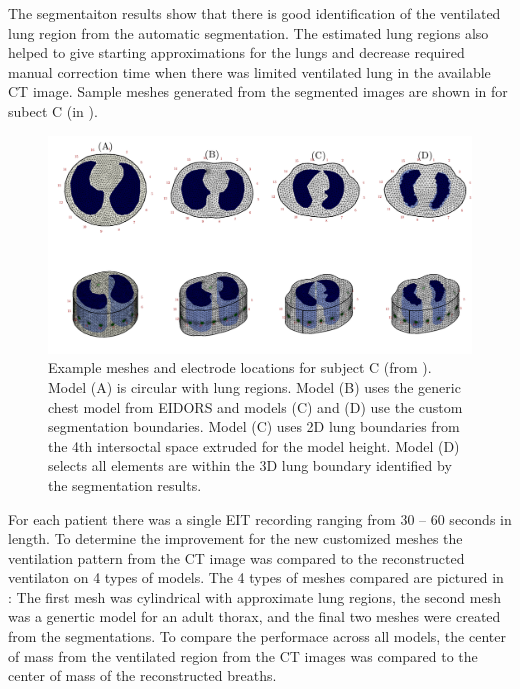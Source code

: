 The segmentaiton results show that there is good identification of the
ventilated lung region from the automatic segmentation. The estimated lung regions also helped to 
give starting approximations for the lungs and decrease required manual 
correction time when there was limited ventilated lung in the available CT image.
Sample meshes generated from the segmented images are shown in  
for subect C (in ).

\begin{figure}
	\centering
	\includegraphics[width=\textwidth]{chapter5-CT_to_mesh/imgs/fem_models_PT04.pdf}
	\caption[Custom and generic meshes]{\label{fig:fem-results}%
	Example meshes and electrode locations for subject C (from ).
	Model (A) is circular with lung regions. Model (B) uses the generic chest model from EIDORS 
	and models (C) and (D) use the custom segmentation boundaries. Model (C) uses 2D lung boundaries 
	from the 4th intersoctal space extruded for the model height. Model (D) selects all elements
	are within the 3D lung boundary identified by the segmentation results.
	}
\end{figure}

For each patient there was a single EIT recording ranging from 30 -- 60 seconds in length.
To determine the improvement for the new customized meshes the ventilation pattern 
from the CT image was compared to the reconstructed ventilaton on 4 types of models.
The 4 types of meshes compared are pictured in : The first mesh was
cylindrical with approximate lung regions, the second mesh was a genertic model 
for an adult thorax, and the final two meshes were created from the segmentations. 
To compare the performace across all models, the center of mass from the 
ventilated region from the CT images was compared to the center of mass of the reconstructed 
breaths.

